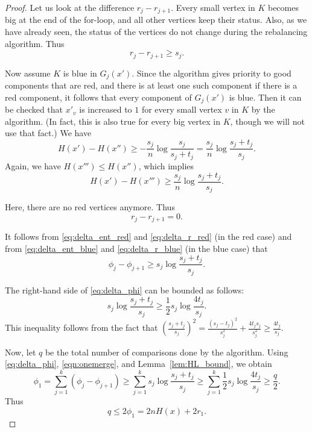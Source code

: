 \documentclass{article} \usepackage{fullpage}
\newcommand{\ent}{H}
\begin{document}
\begin{proof}
Let us look at the difference $r_{j} - r_{j+1}$.
Every small vertex in $K$ becomes big at the end of the for-loop,
and all other vertices keep their status. Also, as we have already seen, the status of the vertices do not change during the rebalancing algorithm. Thus
\begin{equation}
\label{eq:delta_r_red}
r_{j} - r_{j+1} \geq s_{j}.
\end{equation}


Now assume $K$ is blue in $G_{j}(x')$. Since the algorithm gives priority
to good components that are red, and there is at least one such component if there is a red component,
it follows that every component of $G_{j}(x')$ is blue.
Then it can be checked that $x'_{v}$ is increased to $1$ for every small vertex $v$ in $K$
by the algorithm. (In fact, this is also true for every big vertex in $K$, though we will not use
that fact.)  We have
$$
\ent(x') - \ent(x'') \geq 
-\frac {s_{j}}n \log \frac{s_{j}}{s_{j}+t_{j}}
=  \frac {s_{j}}n \log \frac{s_{j}+t_{j}}{s_{j}}.
$$
Again, we have $\ent(x''') \leq \ent(x'')$, which implies
\begin{equation}
\label{eq:delta_ent_blue}
\ent(x') - \ent(x''') \geq 
\frac {s_{j}}n \log \frac{s_{j}+t_{j}}{s_{j}}.
\end{equation}


Here, there are no red vertices anymore. Thus
\begin{equation}
\label{eq:delta_r_blue}
r_{j} - r_{j+1} = 0.
\end{equation}


It follows from \eqref{eq:delta_ent_red} and \eqref{eq:delta_r_red} (in the red case)
and from \eqref{eq:delta_ent_blue} and \eqref{eq:delta_r_blue} (in the blue case)
that
\begin{equation}
\label{eq:delta_phi}
\phi_{j} - \phi_{j+1}
\geq s_{j}\log \frac{s_{j}+t_{j}}{s_{j}}.
\end{equation}


The right-hand side of \eqref{eq:delta_phi} 
can be bounded as follows:
\begin{equation}
\label{eqn:onemerge}
s_{j} \log \frac{s_{j}+t_{j}}{s_{j}} \geq \frac 12 s_{j} \log \frac{4t_{j}}{s_{j}}.
\end{equation}
This inequality follows from the fact that 
$\left(\frac{s_{j}+t_{j}}{s_{j}}\right)^{2}
= \frac{(s_{j}-t_{j})^{2}}{s_{j}^{2}} + \frac{4t_{j}s_{j}}{s_{j}^{2}} \geq \frac{4t_{j}}{s_{j}}$.

Now, let $q$ be the total number of comparisons done by the algorithm.
Using \eqref{eq:delta_phi}, \eqref{eqn:onemerge}, and Lemma~\ref{lem:HL_bound}, we obtain
$$
\phi_{1} = \sum_{j=1}^{k} (\phi_{j} - \phi_{j+1})
\geq \sum_{j=1}^{k}  s_{j} \log \frac{s_{j}+t_{j}}{s_{j}}
\geq \sum_{j=1}^{k} \frac 12 s_{j} \log \frac{4t_{j}}{s_{j}} 
\geq \frac{q}{2}.
$$
Thus
$$
q \leq 2\phi_{1} = 2n \ent(x) + 2 r_{1}.
$$



\end{proof}
\end{document}
